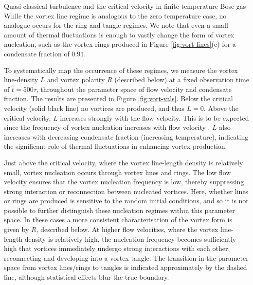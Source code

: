 \begin{chapter}{\label{cha:nonequib}Quasi-classical turbulence and the critical velocity in finite temperature Bose gas}
While the vortex line regime is analogous to the zero temperature case, no analogue occurs for the ring and tangle regimes.   We note that even a small amount of thermal fluctuations is enough to vastly change the form of vortex nucleation, such as the vortex rings produced in Figure \ref{fig:vort-lines}(c) for a condensate fraction of $0.91$.

To systematically map the occurrence of these regimes, we measure the vortex line-density $L$ and vortex polarity $R$ (described below) at a fixed observation time of $\hat{t}=500\tau$, throughout the parameter space of flow velocity and condensate fraction.  The results are presented in Figure \ref{fig:vort-vals}.  Below the critical velocity (solid black line) no vortices are produced, and thus $L=0$.  Above the critical velocity, $L$ increases strongly with the flow velocity.  This is to be expected since the frequency of vortex nucleation increases with flow velocity \cite{frisch92}.  $L$ also increases with decreasing condensate fraction (increasing temperature), indicating the significant role of thermal fluctuations in enhancing vortex production.

Just above the critical velocity, where the vortex line-length density is relatively small, vortex nucleation occurs through vortex lines and rings.  The low flow velocity ensures that the vortex nucleation frequency is low, thereby suppressing strong interaction or reconnection between nucleated vortices.  Here, whether lines or rings are produced is sensitive to the random initial conditions, and so it is not possible to further distinguish these nucleation regimes within this parameter space. In these cases a more consistent characterisation of the vortex form is given by $R$, described below.   At higher flow velocities, where the vortex line-length density is relatively high, the nucleation frequency becomes sufficiently high that vortices immediately undergo strong interactions with each other, reconnecting and developing into a vortex tangle.  The transition in the parameter space from vortex lines/rings to tangles is indicated approximately by the dashed line, although statistical effects blur the true boundary.


\end{chapter}
